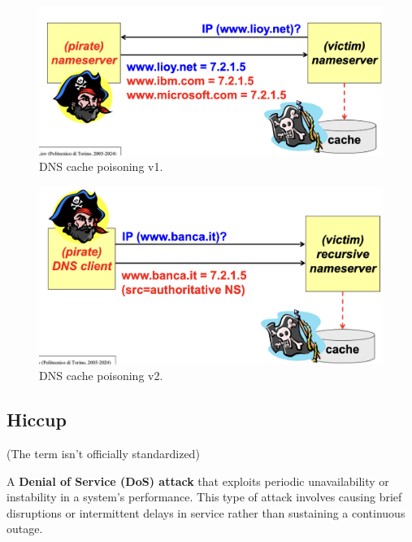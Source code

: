 \begin{multicols}{2}
    \begin{figure}[H]
        \includegraphics[width=\linewidth]{Images/NetSec/dns_cache_pv1.png}
        \caption{DNS cache poisoning v1.}
        \label{fig:dns_pv1}
      \end{figure}

\columnbreak

  
  \begin{figure}[H]
      \includegraphics[width=\linewidth]{Images/NetSec/dns_cache_pv2.png}
      \caption{DNS cache poisoning v2.}
      \label{fig:dns_pv2}
    \end{figure}
    
\end{multicols}


\begin{center}
    \section{Hiccup}
    (The term isn’t officially standardized)
\end{center}
A \textbf{Denial of Service (DoS) attack} that exploits periodic unavailability or instability in a system’s performance. This type of attack involves causing brief disruptions or intermittent delays in service rather than sustaining a continuous outage.

